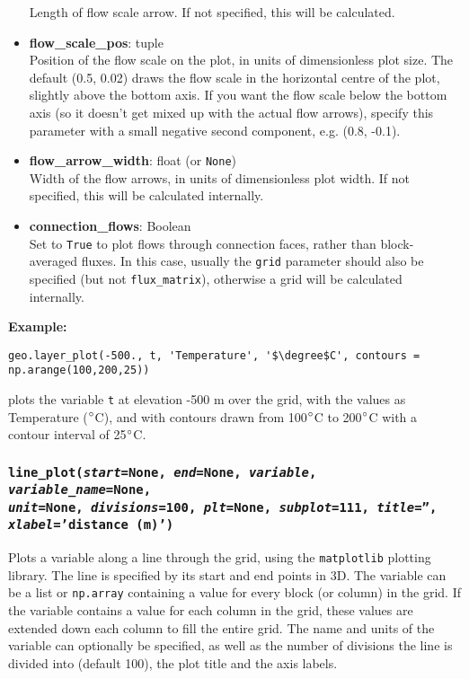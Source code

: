 \begin{itemize}
  Length of flow scale arrow.  If not specified, this will be calculated.
\item \textbf{flow\_scale\_pos}: tuple\\
  Position of the flow scale on the plot, in units of dimensionless plot size.  The default (0.5, 0.02) draws the flow scale in the horizontal centre of the plot, slightly above the bottom axis.  If you want the flow scale below the bottom axis (so it doesn't get mixed up with the actual flow arrows), specify this parameter with a small negative second component, e.g. (0.8, -0.1).
\item \textbf{flow\_arrow\_width}: float (or \texttt{None})\\
  Width of the flow arrows, in units of dimensionless plot width.  If not specified, this will be calculated internally.
\item \textbf{connection\_flows}: Boolean\\
  Set to \texttt{True} to plot flows through connection faces, rather than block-averaged fluxes.  In this case, usually the \texttt{grid} parameter should also be specified (but not \texttt{flux\_matrix}), otherwise a grid will be calculated internally.
\end{itemize}

\textbf{Example:}

\begin{lstlisting}
geo.layer_plot(-500., t, 'Temperature', '$\degree$C', contours = np.arange(100,200,25))
\end{lstlisting}

plots the variable \texttt{t} at elevation -500 m over the grid, with the values as Temperature ($\degree$C), and with contours drawn from 100$\degree$C to 200$\degree$C with a contour interval of 25$\degree$C.

\begin{snugshade}
\subsubsection{\texttt{line\_plot(\emph{start}=None, \emph{end}=None, \emph{variable}, \emph{variable\_name}=None,\\
\emph{unit}=None, \emph{divisions}=100, \emph{plt}=None, \emph{subplot}=111, \emph{title}='',\\
\emph{xlabel}='distance (m)')}}\end{snugshade}
\label{sec:mulgrid:line_plot}

Plots a variable along a line through the grid, using the \texttt{matplotlib} plotting library. The line is specified by its start and end points in 3D.  The variable can be a list or \texttt{np.array} containing a value for every block (or column) in the grid.  If the variable contains a value for each column in the grid, these values are extended down each column to fill the entire grid.  The name and units of the variable can optionally be specified, as well as the number of divisions the line is divided into (default 100), the plot title and the axis labels.

